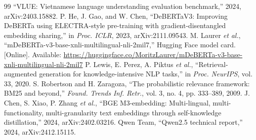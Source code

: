 \documentclass[conference]{IEEEtran}
\begin{document}
\begin{thebibliography}{99}
 ``VLUE: Vietnamese language understanding evaluation benchmark,'' 2024, arXiv:2403.15882.
 P. He, J. Gao, and W. Chen, ``DeBERTaV3: Improving DeBERTa using ELECTRA-style pre-training with gradient-disentangled embedding sharing,'' in \emph{Proc. ICLR}, 2023, arXiv:2111.09543.
 M. Laurer \emph{et al.}, ``mDeBERTa-v3-base-xnli-multilingual-nli-2mil7,'' Hugging Face model card. [Online]. Available: \url{https://huggingface.co/MoritzLaurer/mDeBERTa-v3-base-xnli-multilingual-nli-2mil7}
 P. Lewis, E. Perez, A. Piktus \emph{et al.}, ``Retrieval-augmented generation for knowledge-intensive NLP tasks,'' in \emph{Proc. NeurIPS}, vol. 33, 2020.
 S. Robertson and H. Zaragoza, ``The probabilistic relevance framework: BM25 and beyond,'' \emph{Found. Trends Inf. Retr.}, vol. 3, no. 4, pp. 333--389, 2009.
 J. Chen, S. Xiao, P. Zhang \emph{et al.}, ``BGE M3-embedding: Multi-lingual, multi-functionality, multi-granularity text embeddings through self-knowledge distillation,'' 2024, arXiv:2402.03216.
 Qwen Team, ``Qwen2.5 technical report,'' 2024, arXiv:2412.15115.
\end{thebibliography}
\end{document}
